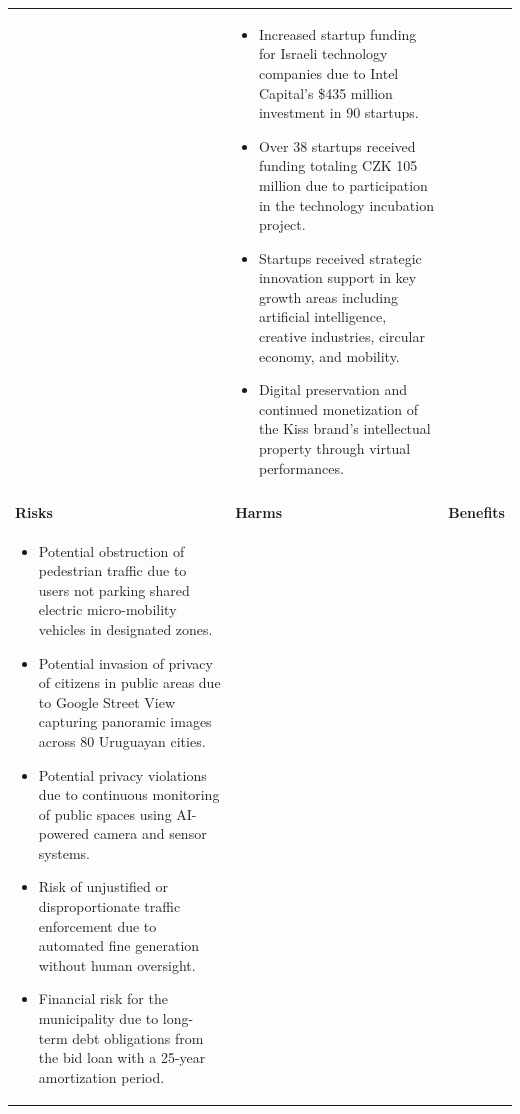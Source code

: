 \begin{longtable}{p{5.2cm}|p{5.2cm}|p{5.2cm}}
\begin{itemize}[leftmargin=*, nosep, before=\vspace{-0.5\baselineskip}, after=\vspace{-0.5\baselineskip}]
\end{itemize} & \begin{itemize}[leftmargin=*, nosep, before=\vspace{-0.5\baselineskip}, after=\vspace{-0.5\baselineskip}] 
\footnotesize
\item Increased startup funding for Israeli technology companies due to Intel Capital's \$435 million investment in 90 startups.
\item Over 38 startups received funding totaling CZK 105 million due to participation in the technology incubation project.
\item Startups received strategic innovation support in key growth areas including artificial intelligence, creative industries, circular economy, and mobility.
\item Digital preservation and continued monetization of the Kiss brand's intellectual property through virtual performances.
\end{itemize} \\
\pagebreak
\multicolumn{3}{l}{\textbf{\large Urban Planning} \textit{(N=22 articles)}} \\
\midrule
\textbf{Risks} & \textbf{Harms} & \textbf{Benefits} \\
\midrule
\begin{itemize}[leftmargin=*, nosep, before=\vspace{-0.5\baselineskip}, after=\vspace{-0.5\baselineskip}] 
\footnotesize
\item Potential obstruction of pedestrian traffic due to users not parking shared electric micro-mobility vehicles in designated zones.
\item Potential invasion of privacy of citizens in public areas due to Google Street View capturing panoramic images across 80 Uruguayan cities.
\item Potential privacy violations due to continuous monitoring of public spaces using AI-powered camera and sensor systems.
\item Risk of unjustified or disproportionate traffic enforcement due to automated fine generation without human oversight.
\item Financial risk for the municipality due to long-term debt obligations from the bid loan with a 25-year amortization period.
\end{itemize} & \begin{itemize}[leftmargin=*, nosep, before=\vspace{-0.5\baselineskip}, after=\vspace{-0.5\baselineskip}] 

\end{itemize}
\end{longtable}
